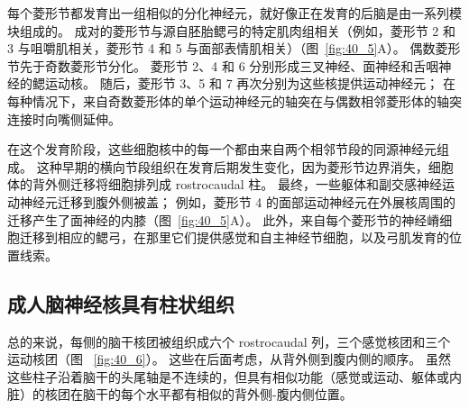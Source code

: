 每个菱形节都发育出一组相似的分化神经元，就好像正在发育的后脑是由一系列模块组成的。
成对的菱形节与源自胚胎鳃弓的特定肌肉组相关（例如，菱形节 2 和 3 与咀嚼肌相关，菱形节 4 和 5 与面部表情肌相关）（图~\ref{fig:40_5}A）。
偶数菱形节先于奇数菱形节分化。
菱形节 2、4 和 6 分别形成三叉神经、面神经和舌咽神经的鳃运动核。
随后，菱形节 3、5 和 7 再次分别为这些核提供运动神经元；
在每种情况下，来自奇数菱形体的单个运动神经元的轴突在与偶数相邻菱形体的轴突连接时向嘴侧延伸。


在这个发育阶段，这些细胞核中的每一个都由来自两个相邻节段的同源神经元组成。
这种早期的横向节段组织在发育后期发生变化，因为菱形节边界消失，细胞体的背外侧迁移将细胞排列成 rostrocaudal 柱。
最终，一些躯体和副交感神经运动神经元迁移到腹外侧被盖；
例如，菱形节 4 的面部运动神经元在外展核周围的迁移产生了面神经的内膝（图~\ref{fig:40_5}A）。
此外，来自每个菱形节的神经嵴细胞迁移到相应的鳃弓，在那里它们提供感觉和自主神经节细胞，以及弓肌发育的位置线索。



\subsection{成人脑神经核具有柱状组织}

总的来说，每侧的脑干核团被组织成六个 rostrocaudal 列，三个感觉核团和三个运动核团（图 ~\ref{fig:40_6}）。
这些在后面考虑，从背外侧到腹内侧的顺序。
虽然这些柱子沿着脑干的头尾轴是不连续的，但具有相似功能（感觉或运动、躯体或内脏）的核团在脑干的每个水平都有相似的背外侧-腹内侧位置。


